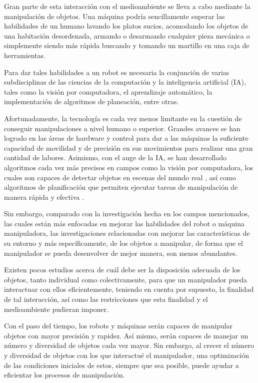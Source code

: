 Gran parte de esta interacción con el medioambiente se lleva a cabo mediante la manipulación de objetos.
Una máquina podría sencillamente superar las habilidades de un humano lavando los platos sucios, acomodando los objetos de una habitación desordenada, armando o desarmando cualquier pieza mecánica o simplemente siendo más rápida buscando y tomando un martillo en una caja de herramientas.

Para dar tales habilidades a un robot es necesaria la conjunción de varias subdisciplinas de las ciencias de la computación y la inteligencia artificial (IA), tales como la visión por computadora, el aprendizaje automático, la implementación de algoritmos de planeación, entre otras.

Afortunadamente, la tecnología es cada vez menos limitante en la cuestión de conseguir manipulaciones a nivel humano o superior.
Grandes avances se han logrado en las áreas de hardware y control para dar a las máquinas la suficiente capacidad de movilidad y de precisión en sus movimientos para realizar una gran cantidad de labores.
Asimismo, con el auge de la IA, se han desarrollado algoritmos cada vez más precisos en campos como la visión por computadora, los cuales son capaces de detectar objetos en escenas del mundo real \cite{Georgakis-RSS-17}, así como algoritmos de planificación que permiten ejecutar tareas de manipulación de manera rápida y efectiva \cite{10160887}.

Sin embargo, comparado con la investigación hecha en los campos mencionados, las cuales están más enfocadas en mejorar las habilidades del robot o máquina manipuladora, las investigaciones relacionadas con mejorar las características de su entorno y más específicamente, de los objetos a manipular, de forma que el manipulador se pueda desenvolver de mejor manera, son menos abundantes.

Existen pocos estudios acerca de cuál debe ser la disposición adecuada de los objetos, tanto individual como colectivamente, para que un manipulador pueda interactuar con ellos eficientemente, teniendo en cuenta por supuesto, la finalidad de tal interacción, así como las restricciones que esta finalidad y el medioambiente pudieran imponer.

Con el paso del tiempo, los robots y máquinas serán capaces de manipular objetos con mayor precisión y rapidez.
Así mismo, serán capaces de manejar un número y diversidad de objetos cada vez mayor.
Sin embargo, al crecer el número y diversidad de objetos con los que interactué el manipulador, una optimización de las condiciones iniciales de estos, siempre que sea posible, puede ayudar a eficientar los procesos de manipulación.

